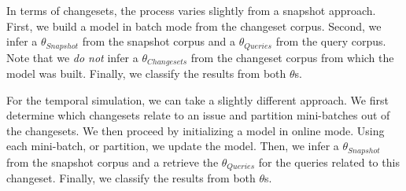 In terms of changesets, the process varies slightly from a snapshot approach.
First, we build a model in batch mode from the changeset corpus.
Second, we infer a $\theta_{Snapshot}$ from the snapshot corpus
and a $\theta_{Queries}$ from the query corpus.
Note that we \emph{do not} infer a $\theta_{Changesets}$ from the changeset corpus from which the model was built.
Finally, we classify the results from both $\theta$s.

\begin{comment}
\begin{enumerate}
    \item Build model from the changeset corpus in batch mode
    \item \emph{Do not} infer a $\theta_{Changesets}$
    \item Infer a $\theta_{Snapshot}$ from the snapshot corpus
    \item Infer a  $\theta_{Queries}$ from the query corpus
    \item Classify, or rank, the results from both $\theta$s
\end{enumerate}
\end{comment}


For the temporal simulation, we can take a slightly different approach.
We first determine which changesets relate to an issue and partition mini-batches out of the changesets.
We then proceed by initializing a model in online mode.
Using each mini-batch, or partition, we update the model.
Then, we infer a $\theta_{Snapshot}$ from the snapshot corpus
and a retrieve the $\theta_{Queries}$ for the queries related to this changeset.
Finally, we classify the results from both $\theta$s.

\begin{comment}
\begin{enumerate}
    \item Initialize a model in online mode
    \item Determine which changesets relate to an issue and partition mini-batches out of the changesets
    \item For each mini-batch:
        \begin{enumerate}
            \item Update the model with mini-batch
            \item Update $\theta_{Snapshot}$ with the new inference of the source code document affected by this changeset
            \item Infer a $\theta_{Query}$ of the query related to the changeset we stopped at
            \item Classify, or rank, the results from both $\theta$s
        \end{enumerate}
\end{enumerate}
\end{comment}

